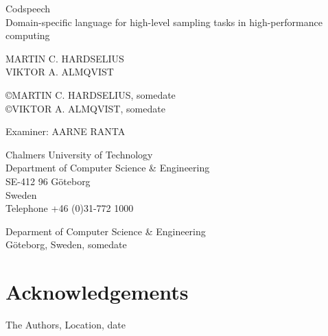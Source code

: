 \begin{flushleft}
Codspeech\\
Domain-specific language for high-level sampling tasks in
high-performance computing
\vspace{11pt}

MARTIN C. HARDSELIUS\\
VIKTOR A. ALMQVIST
\vspace{11pt}

\copyright{MARTIN C. HARDSELIUS}, somedate \\
\copyright{VIKTOR A. ALMQVIST}, somedate
\vspace{11pt}

Examiner: {AARNE RANTA}
\vspace{11pt}

Chalmers University of Technology\\
Department of Computer Science \& Engineering\\
SE-412 96 Göteborg\\
Sweden\\
Telephone +46 (0)31-772 1000
\vspace{66pt}

Deparment of Computer Science \& Engineering\\
Göteborg, Sweden, somedate
\end{flushleft}

\newpage
\clearpage

\begin{abstract}
\lipsum[1]
\end{abstract}

\newpage
\clearpage
\mbox{}
\newpage
\clearpage
\thispagestyle{empty}
\chapter*{Acknowledgements}
\lipsum[1]

\hfill The Authors, Location, date
\newpage
\clearpage
\mbox{}
